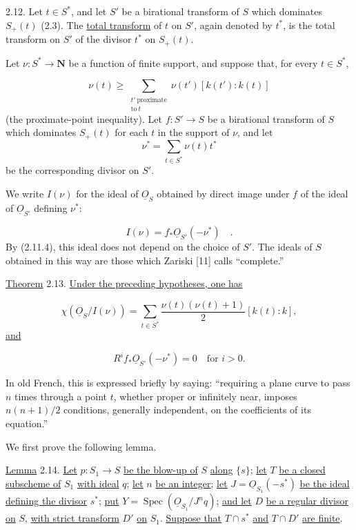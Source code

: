 2.12. Let $t\in S^*$, and let $S'$ be a birational transform of $S$ which
dominates $S_+(t)$ (2.3).  The \underline{total transform} of $t$ on $S'$,
again denoted by $t^*$, is the total transform on $S'$ of the divisor $t^*$ on
$S_+(t)$.

Let $\nu:S^*\longrightarrow\mathbf N$ be a function of finite support, and
suppose that, for every $t\in S^*$,

\begin{equation}\tag{2.12.1}
\nu(t)\geq
\sum_{\substack{t'\ \mathrm{proximate}\\\mathrm{to}\ t}}
\nu(t')[k(t'):k(t)]
\end{equation}
(the proximate-point inequality).  Let $f:S'\longrightarrow S$ be a birational
transform of $S$ which dominates $S_+(t)$ for each $t$ in the support of $\nu$,
and let
\[
\nu^*=\sum_{t\in S^*}\nu(t)t^*
\]
be the corresponding divisor on $S'$.


We write $I(\nu)$ for the ideal of $\underline{O}_S$ obtained by direct image
under $f$ of the ideal of $\underline{O}_{S'}$ defining $\nu^*$:

\begin{equation*}
I(\nu)=f_*\underline{O}_{S'}(-\nu^*) \quad .
\end{equation*}
By (2.11.4), this ideal does not depend on the choice of $S'$.  The ideals of
$S$ obtained in this way are those which Zariski [11] calls ``complete.''

\underline{Theorem} 2.13. \underline{Under the preceding hypotheses, one has}

\begin{equation*}
\chi(\underline{O}_S/I(\nu))
=\sum_{t\in S^*}\frac{\nu(t)(\nu(t)+1)}2[k(t):k],
\end{equation*}
\underline{and}

\begin{equation*}
R^if_*\underline{O}_{S'}(-\nu^*)=0
\quad\text{for }i>0.
\end{equation*}

In old French, this is expressed briefly by saying: ``requiring a plane curve to
pass $n$ times through a point $t$, whether proper or infinitely near, imposes
$n(n+1)/2$ conditions, generally independent, on the coefficients of its
equation.''

We first prove the following lemma.

\underline{Lemma} 2.14. \underline{Let} $p:S_1\longrightarrow S$
\underline{be the blow-up of} $S$ \underline{along} $\{s\}$; \underline{let}
$T$ \underline{be a closed subscheme of} $S_1$ \underline{with ideal} $q$;
\underline{let} $n$ \underline{be an integer}; \underline{let}
$J=\underline{O}_{S_1}(-s^*)$ \underline{be the ideal defining the divisor}
$s^*$; \underline{put}
$Y=\operatorname{Spec}(\underline{O}_{S_1}/J^nq)$; \underline{and let} $D$
\underline{be a regular divisor on} $S$, \underline{with strict transform} $D'$
\underline{on} $S_1$. \underline{Suppose that} $T\cap s^*$ \underline{and}
$T\cap D'$ \underline{are finite}.

